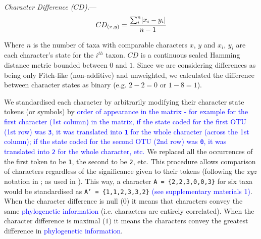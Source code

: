 \documentclass[12pt,letterpaper]{article}
\DeclarePairedDelimiter\abs{\lvert}{\rvert}%
\renewcommand{\subsubsection}[1]{%
\vspace{2ex}
\noindent
\textit{#1.}---}
\begin{document}
\subsubsection{Character Difference ($CD$)}
\begin{equation}
    CD_{(x,y)} = \frac{\sum_{i}^{n}\abs{x_{i} - y_{i}}}{n-1}
\end{equation}

\noindent Where $n$ is the number of taxa with comparable characters $x$, $y$ and $x_i$, $y_i$ are each character's state for the $i^{th}$ taxon.
$CD$ is a continuous scaled Hamming distance metric bounded between $0$ and $1$.
Since we are considering differences as being only Fitch-like (non-additive) and unweighted, we calculated the difference between character states as binary (e.g. $2 - 2 = 0$ or $1 - 8 = 1$).

We standardised each character by arbitrarily modifying their character state tokens (or symbols) by \textcolor{blue}{order of appearance in the matrix - for example for the first character (1st column) in the matrix, if the state coded for the first OTU (1st row) was \texttt{3}, it was translated into \texttt{1} for the whole character (across the 1st column); if the state coded for the second OTU (2nd row) was \texttt{0}, it was translated into \texttt{2} for the whole character, etc.}
We replaced all the occurrences of the first token to be \texttt{1}, the second to be \texttt{2}, etc.
This procedure allows comparison of characters regardless of the significance given to their tokens (following the \textit{xyz} notation in \citealt{felsenstein2004inferring}; as used in \citealt{Davalos01072014}).
This way, a character \texttt{A = \{2,2,3,0,0,3\}} for six taxa would be standardised as \texttt{A' = \{1,1,2,3,3,2\}} \textcolor{blue}{(see supplementary materials 1)}.
When the character difference is null ($0$) it means that characters convey the same \textcolor{blue}{phylogenetic information} (i.e. characters are entirely correlated). 
When the character difference is maximal ($1$) it means the characters convey the greatest difference in \textcolor{blue}{phylogenetic information}.
\end{document}
